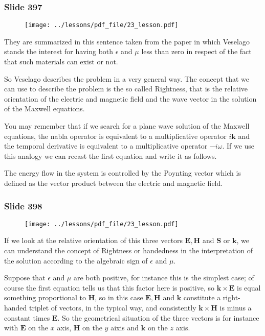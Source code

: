 \documentclass[../main/main.tex]{subfiles}
\begin{document}
\newpage

\subsubsection{Slide 397}

\begin{figure}[h!]
\centering
\texttt{[image: ../lessons/pdf\_file/23\_lesson.pdf]}
\end{figure}

They are summarized in this sentence taken from the paper in which Veselago stands the interest for having both $\epsilon$ and $\mu$ less than zero in respect of the fact that such materials can exist or not. 

So Veselago describes the problem in a very general way. The concept that we can use to describe the problem is the so called Rightness, that is the relative orientation of the electric and magnetic field and the wave vector in the solution of the Maxwell equations.

You may remember that if we search for a plane wave solution of the Maxwell equations, the nabla operator is equivalent to a multiplicative operator $i\mathbf{k}$ and the temporal derivative is equivalent to a multiplicative operator $-i\omega$. If we use this analogy we can recast the first equation and write it as follows.

The energy flow in the system is controlled by the Poynting vector which is defined as the vector product between the electric and magnetic field. 

\newpage

\subsubsection{Slide 398}

\begin{figure}[h!]
\centering
\texttt{[image: ../lessons/pdf\_file/23\_lesson.pdf]}
\end{figure}

If we look at the relative orientation of this three vectors $\mathbf{E, H}$ and $\mathbf{S}$ or $\mathbf{k}$, we can understand the concept of Rightness or handedness in the interpretation of the solution according to the algebraic sign of $\epsilon$ and $\mu$. 

Suppose that $\epsilon$ and $\mu$ are both positive, for instance this is the simplest case; of course the first equation tells us that this factor here is positive, so $\mathbf{k} \times \mathbf{E}$ is equal something proportional to $\mathbf{H}$, so in this case $\mathbf{E, H}$ and $\mathbf{k}$ constitute a right-handed triplet of vectors, in the typical way, and consistently $\mathbf{k} \times \mathbf{H}$ is minus a constant times $\mathbf{E}$. So the geometrical situation of the three vectors is for instance with $\mathbf{E}$ on the $x$ axis, $\mathbf{H}$ on the $y$ aixis and $\mathbf{k}$ on the $z$ axis. 
\end{document}

